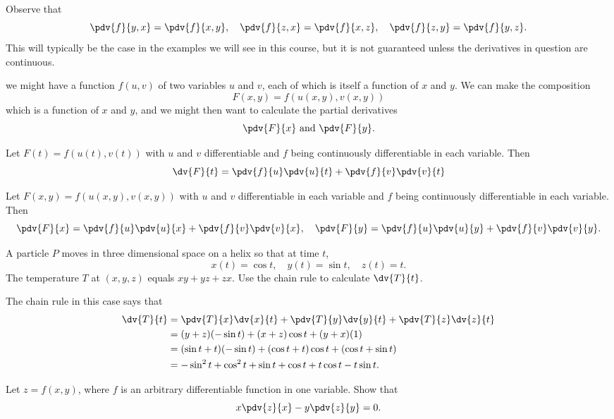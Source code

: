 Observe that
\[ \pdv{f}{y,x}=\pdv{f}{x,y}, \quad \pdv{f}{z,x}=\pdv{f}{x,z}, \quad \pdv{f}{z,y}=\pdv{f}{y,z}. \]
This will typically be the case in the examples we will see in this course, but it is not guaranteed unless the derivatives in question are continuous.

we might have a function $f(u,v)$ of two variables $u$ and $v$, each of which is itself a function of $x$ and $y$. We can make the composition
\[ F(x,y)=f(u(x,y),v(x,y)) \]
which is a function of $x$ and $y$, and we might then want to calculate the partial derivatives
\[ \pdv{F}{x}\text{ and }\pdv{F}{y}. \]

\begin{theorem}
Let $F(t)=f(u(t),v(t))$ with $u$ and $v$ differentiable and $f$ being continuously differentiable in each variable. Then
\begin{equation}
\dv{F}{t}=\pdv{f}{u}\pdv{u}{t}+\pdv{f}{v}\pdv{v}{t}
\end{equation}
\end{theorem}

\begin{corollary}
Let $F(x,y)=f(u(x,y),v(x,y))$ with $u$ and $v$ differentiable in each variable and $f$ being continuously differentiable in each variable. Then
\[ \pdv{F}{x}=\pdv{f}{u}\pdv{u}{x}+\pdv{f}{v}\pdv{v}{x}, \quad \pdv{F}{y}=\pdv{f}{u}\pdv{u}{y}+\pdv{f}{v}\pdv{v}{y}. \]
\end{corollary}

\begin{exercise}
A particle $P$ moves in three dimensional space on a helix so that at time $t$,
\[ x(t)=\cos t, \quad y(t)=\sin t, \quad z(t)=t. \]
The temperature $T$ at $(x,y,z)$ equals $xy+yz+zx$. Use the chain rule to calculate $\dv{T}{t}$.
\end{exercise}

\begin{solution}
The chain rule in this case says that
\begin{align*}
\dv{T}{t} &= \pdv{T}{x}\dv{x}{t}+\pdv{T}{y}\dv{y}{t}+\pdv{T}{z}\dv{z}{t} \\
&= (y+z)(-\sin t)+(x+z)\cos t+(y+x)(1) \\
&= (\sin t+t)(-\sin t)+(\cos t+t)\cos t+(\cos t+\sin t) \\
&= -\sin^2t+\cos^2t+\sin t+\cos t+t\cos t-t\sin t.
\end{align*}
\end{solution}

\begin{exercise}
Let $z=f(x,y)$, where $f$ is an arbitrary differentiable function in one variable. Show that
\[ x\pdv{z}{x}-y\pdv{z}{y}=0. \]
\end{exercise}

